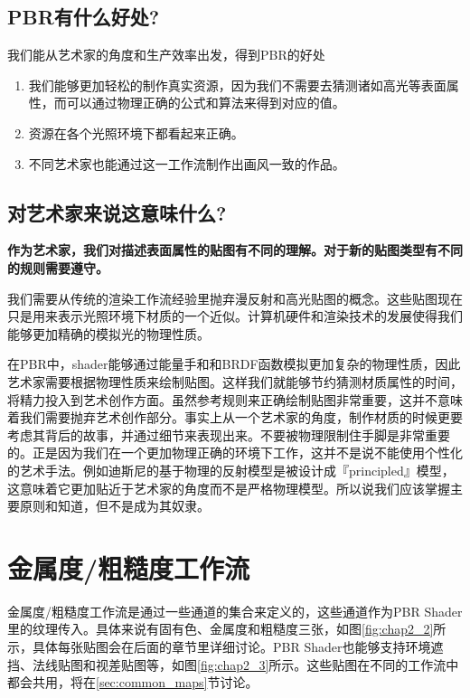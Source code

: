 \subsection{PBR有什么好处?}

我们能从艺术家的角度和生产效率出发，得到PBR的好处

\begin{enumerate}
\item 我们能够更加轻松的制作真实资源，因为我们不需要去猜测诸如高光等表面属性，而可以通过物理正确的公式和算法来得到对应的值。
\item 资源在各个光照环境下都看起来正确。
\item 不同艺术家也能通过这一工作流制作出画风一致的作品。
\end{enumerate}

\subsection{对艺术家来说这意味什么?}

\textbf{作为艺术家，我们对描述表面属性的贴图有不同的理解。对于新的贴图类型有不同的规则需要遵守。}

我们需要从传统的渲染工作流经验里抛弃漫反射和高光贴图的概念。这些贴图现在只是用来表示光照环境下材质的一个近似。计算机硬件和渲染技术的发展使得我们能够更加精确的模拟光的物理性质。

在PBR中，shader能够通过能量手和和BRDF函数模拟更加复杂的物理性质，因此艺术家需要根据物理性质来绘制贴图。这样我们就能够节约猜测材质属性的时间，将精力投入到艺术创作方面。虽然参考规则来正确绘制贴图非常重要，这并不意味着我们需要抛弃艺术创作部分。事实上从一个艺术家的角度，制作材质的时候更要考虑其背后的故事，并通过细节来表现出来。不要被物理限制住手脚是非常重要的。正是因为我们在一个更加物理正确的环境下工作，这并不是说不能使用个性化的艺术手法。例如迪斯尼的基于物理的反射模型是被设计成『principled』模型，这意味着它更加贴近于艺术家的角度而不是严格物理模型。所以说我们应该掌握主要原则和知道，但不是成为其奴隶。

\section{金属度/粗糙度工作流}

金属度/粗糙度工作流是通过一些通道的集合来定义的，这些通道作为PBR Shader里的纹理传入。具体来说有固有色、金属度和粗糙度三张，如图\ref{fig:chap2_2}所示，具体每张贴图会在后面的章节里详细讨论。PBR Shader也能够支持环境遮挡、法线贴图和视差贴图等，如图\ref{fig:chap2_3}所示。这些贴图在不同的工作流中都会共用，将在\ref{sec:common_maps}节讨论。

